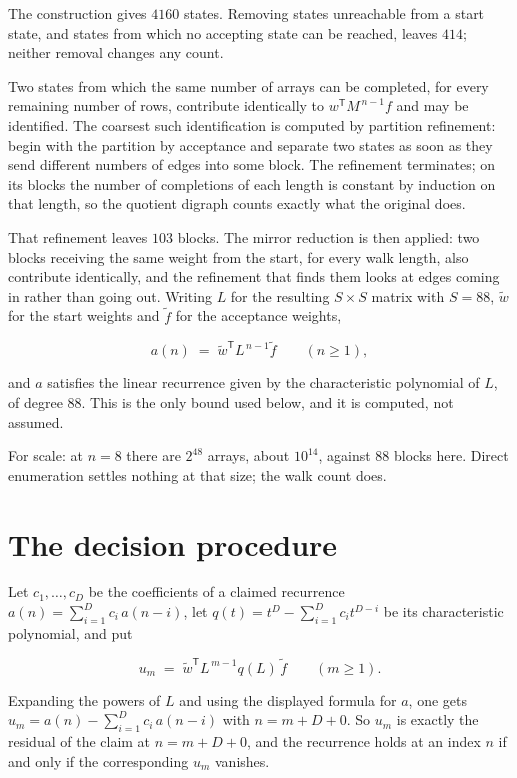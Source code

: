 \documentclass[11pt]{article}
\theoremstyle{definition}
\begin{document}
The construction gives $4160$ states. Removing states unreachable from a start state, and states from which no accepting state can be reached, leaves $414$; neither removal changes any count.

Two states from which the same number of arrays can be completed, for every remaining number of rows, contribute identically to $w^{\mathsf T}M^{\,n-1}f$ and may be identified. The coarsest such identification is computed by partition refinement: begin with the partition by acceptance and separate two states as soon as they send different numbers of edges into some block. The refinement terminates; on its blocks the number of completions of each length is constant by induction on that length, so the quotient digraph counts exactly what the original does.

That refinement leaves $103$ blocks. The mirror reduction is then applied: two blocks receiving the same weight from the start, for every walk length, also contribute identically, and the refinement that finds them looks at edges coming in rather than going out. Writing $L$ for the resulting $S \times S$ matrix with $S = 88$, $\tilde w$ for the start weights and $\tilde f$ for the acceptance weights,

\[a(n) \;=\; \tilde w^{\mathsf T} L^{\,n-1} \tilde f \qquad (n \ge 1),\]

and $a$ satisfies the linear recurrence given by the characteristic polynomial of $L$, of degree $88$. This is the only bound used below, and it is computed, not assumed.

For scale: at $n = 8$ there are $2^{48}$ arrays, about $10^{14}$, against $88$ blocks here. Direct enumeration settles nothing at that size; the walk count does.

\section{The decision procedure}

Let $c_1,\dots,c_D$ be the coefficients of a claimed recurrence $a(n) = \sum_{i=1}^{D} c_i\,a(n-i)$, let $q(t) = t^{D} - \sum_{i=1}^{D} c_i t^{D-i}$ be its characteristic polynomial, and put

\[u_m \;=\; \tilde w^{\mathsf T} L^{\,m-1} q(L)\,\tilde f \qquad (m \ge 1).\]

Expanding the powers of $L$ and using the displayed formula for $a$, one gets $u_m = a(n) - \sum_{i=1}^{D} c_i\,a(n-i)$ with $n = m + D + 0$. So $u_m$ is exactly the residual of the claim at $n = m + D + 0$, and the recurrence holds at an index $n$ if and only if the corresponding $u_m$ vanishes.
\end{document}

